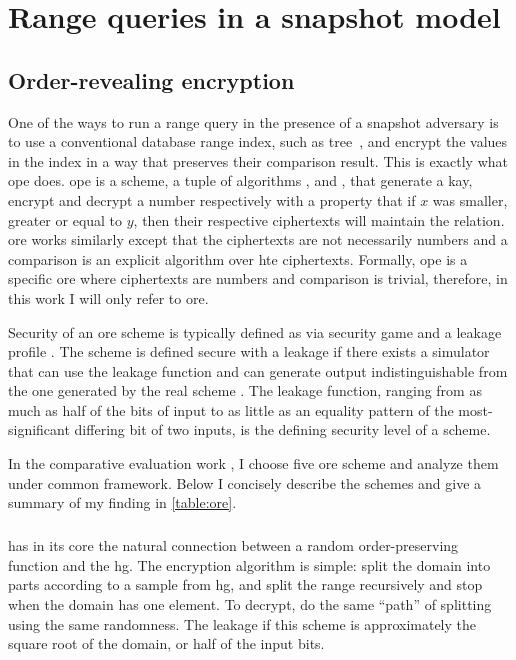 \chapter{Range queries in a snapshot model}\label{section:range-queries-snapshot}
\thispagestyle{myheadings}

	\section{Order-revealing encryption}

		One of the ways to run a range query in the presence of a snapshot adversary is to use a conventional database range index, such as \BPlus{} tree~\cite{b-tree}, and encrypt the values in the index in a way that preserves their comparison result.
		This is exactly what \gls{ope} does.
		\gls{ope} is a scheme, a tuple of algorithms ,  and , that generate a kay, encrypt and decrypt a number respectively with a property that if $x$ was smaller, greater or equal to $y$, then their respective ciphertexts will maintain the relation.
		\gls{ore} works similarly except that the ciphertexts are not necessarily numbers and a comparison is an explicit algorithm  over hte ciphertexts.
		Formally, \gls{ope} is a specific \gls{ore} where ciphertexts are numbers and comparison is trivial, therefore, in this work I will only refer to \gls{ore}.

		Security of an \gls{ore} scheme is typically defined as via security game and a leakage profile \cite{practical-ore}.
		The scheme is defined secure with a leakage \leakage{} if there exists a simulator that can use the leakage function and can generate output indistinguishable from the one generated by the real scheme \cite{ore-benchmark-17}.
		The leakage function, ranging from as much as half of the bits of input to as little as an equality pattern of the most-significant differing bit of two inputs, is the defining security level of a scheme.

		In the comparative evaluation work \cite{ore-benchmark-17}, I choose five \gls{ore} scheme and analyze them under common framework.
		Below I concisely describe the schemes and give a summary of my finding in \cref{table:ore}.

		\paragraph*{\cite{bclo-ope}} has in its core the natural connection between a random order-preserving function and the \gls{hg}.
		The encryption algorithm is simple: split the domain into parts according to a sample from \gls{hg}, and split the range recursively and stop when the domain has one element.
		To decrypt, do the same ``path'' of splitting using the same randomness.
		The leakage if this scheme is approximately the square root of the domain, or half of the input bits.

